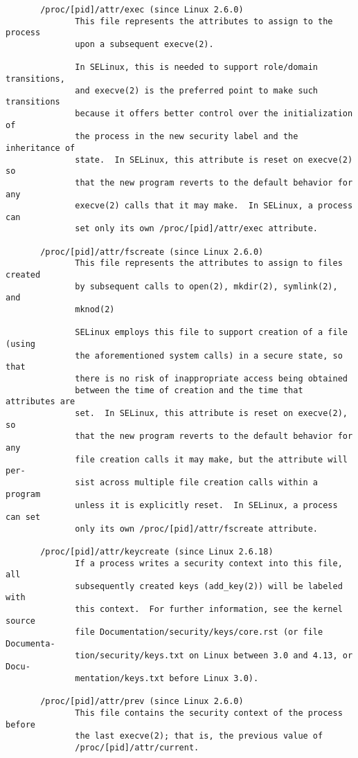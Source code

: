\documentclass[]{article}
\begin{document}
\begin{verbatim}
       /proc/[pid]/attr/exec (since Linux 2.6.0)
              This file represents the attributes to assign to the process
              upon a subsequent execve(2).

              In SELinux, this is needed to support role/domain transitions,
              and execve(2) is the preferred point to make such transitions
              because it offers better control over the initialization of
              the process in the new security label and the inheritance of
              state.  In SELinux, this attribute is reset on execve(2) so
              that the new program reverts to the default behavior for any
              execve(2) calls that it may make.  In SELinux, a process can
              set only its own /proc/[pid]/attr/exec attribute.

       /proc/[pid]/attr/fscreate (since Linux 2.6.0)
              This file represents the attributes to assign to files created
              by subsequent calls to open(2), mkdir(2), symlink(2), and
              mknod(2)

              SELinux employs this file to support creation of a file (using
              the aforementioned system calls) in a secure state, so that
              there is no risk of inappropriate access being obtained
              between the time of creation and the time that attributes are
              set.  In SELinux, this attribute is reset on execve(2), so
              that the new program reverts to the default behavior for any
              file creation calls it may make, but the attribute will per‐
              sist across multiple file creation calls within a program
              unless it is explicitly reset.  In SELinux, a process can set
              only its own /proc/[pid]/attr/fscreate attribute.

       /proc/[pid]/attr/keycreate (since Linux 2.6.18)
              If a process writes a security context into this file, all
              subsequently created keys (add_key(2)) will be labeled with
              this context.  For further information, see the kernel source
              file Documentation/security/keys/core.rst (or file Documenta‐
              tion/security/keys.txt on Linux between 3.0 and 4.13, or Docu‐
              mentation/keys.txt before Linux 3.0).

       /proc/[pid]/attr/prev (since Linux 2.6.0)
              This file contains the security context of the process before
              the last execve(2); that is, the previous value of
              /proc/[pid]/attr/current.


\end{verbatim}
\end{document}
